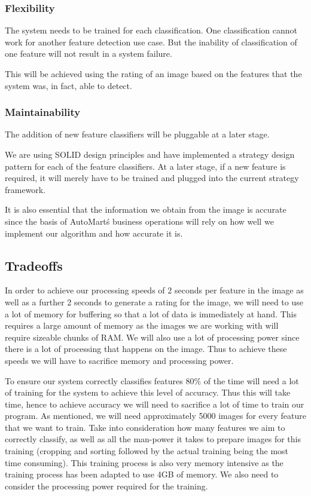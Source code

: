 \subsubsection{Flexibility}
The system needs to be trained for each classification. One classification cannot work for another feature detection use case. But the inability of classification of one feature will not result in a system failure. 

This will be achieved using the rating of an image based on the features that the system was, in fact, able to detect.
\subsubsection{Maintainability}
The addition of new feature classifiers will be pluggable at a later stage. 

We are using SOLID design principles and have implemented a strategy design pattern for each of the feature classifiers. At a later stage, if a new feature is required, it will merely have to be trained and plugged into the current strategy framework.

It is also essential that the information we obtain from the image is accurate since the basis of AutoMart\'s business operations will rely on how well we implement our algorithm and how accurate it is.

\subsection{Tradeoffs}
In order to achieve our processing speeds of 2 seconds per feature in the image as well as a further 2 seconds to generate a rating for the image, we will need to use a lot of memory for buffering so that a lot of data is immediately at hand. This requires a large amount of memory as the images we are working with will require sizeable chunks of RAM. We will also use a lot of processing power since there is a lot of processing that happens on the image. Thus to achieve these speeds we will have to sacrifice memory and processing power.

To ensure our system correctly classifies features 80\% of the time will need a lot of training for the system to achieve this level of accuracy. Thus this will take time, hence to achieve accuracy we will need to sacrifice a lot of time to train our program. As mentioned, we will need approximately 5000 images for every feature that we want to train. Take into consideration how many features we aim to correctly classify, as well as all the man-power it takes to prepare images for this training (cropping and sorting followed by the actual training being the most time consuming). This training process is also very memory intensive as the training process has been adapted to use 4GB of memory. We also need to consider the processing power required for the training.

